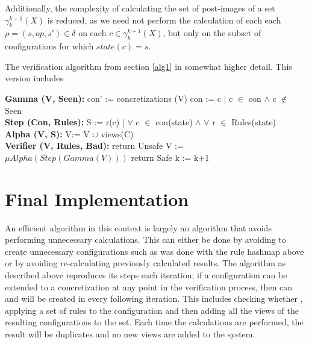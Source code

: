 Additionally, the complexity of calculating the set of post-images of a set $\gamma_k^{k+1}(X)$ is reduced, as we need not perform the calculation of each each $\rho = (s, op, s') \in \delta$ on each $c \in \gamma_k^{k+1}(X)$, but only on the subset of configurations for which $state(c) = s$.


\begin{algorithm}
  \caption{The verification algorithm from section \ref{alg1} in somewhat higher detail. This version includes }\label{euclid}
  \begin{algorithmic}[1]
    \State \textbf{Gamma (V, Seen):}
    \State \hspace{6 mm} con' := concretizations (V)
    \State \hspace{6 mm} con  := c | c $\in$ con $\land$ c $\notin$ Seen
    \\
    \State \textbf{Step (Con, Rules):}
    \State \hspace{6 mm} S := r(c) | $\forall$ c $\in$ con(state) $\land$ $\forall$ r $\in$ Rules(state)
    \EndFor
    \\
    \State \textbf{Alpha (V, S):}
    \State \hspace{6 mm} V:= V $\cup$ views(C)
    \\
    \State \textbf{Verifier (V, Rules, Bad):}
        \State return Unsafe
        \EndIf
        \State V := $\mu Alpha(Step(Gamma(V)))$
        \State return Safe
        \EndIf
        \State k := k+1
      \EndFor
\end{algorithmic}
\end{algorithm}


\newpage
\section{Final Implementation}
An efficient algorithm in this context is largely an algorithm that avoids performing unnecessary calculations. This can either be done by avoiding to create unnecessary configurations such as was done with the rule hashmap above or by avoiding re-calculating previously calculated results. The algorithm as described above reproduces its steps each iteration; if a configuration  can be extended to a concretization  at any point in the verification process, then  can and will be created in every following iteration. This includes checking whether , applying a set of rules to the configuration and then adding all the views of the resulting configurations to the set. Each time the calculations are performed, the result will be duplicates and no new views are added to the system.

